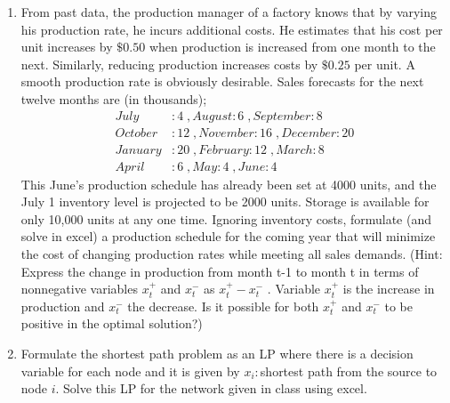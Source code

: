 \documentclass{article}[11 pt]    %
\begin{document}
\begin{enumerate}
\item From past data, the production manager of a factory knows that by varying his production rate, he incurs additional costs. He estimates that his cost per unit increases by $\$0.50$ when production is increased from one month to the next. Similarly, reducing production increases costs by $\$0.25$ per unit. A smooth production rate is obviously desirable.
Sales forecasts for the next twelve months are (in thousands);
\begin{align*}
July&:4 \;,August:6\; ,September:8\\
October&:12\;, November:16\;, December:20\\
January&:20 \;, February:12\;, March:8\\
April&:6 \;, May:4 \;, June:4
\end{align*}
This June's production schedule has already been set at 4000 units, and the July 1 inventory level is projected to be 2000 units. Storage is available for only 10,000 units at any one time. Ignoring inventory costs, formulate (and solve in excel) a production schedule for the coming year that will minimize the cost of changing production rates while meeting all sales demands. (Hint: Express the change in production from month t-1 to month t in terms of nonnegative variables $x_t^+$ and $x_t^-$ as $x_t^+ - x_t^-$ . Variable $x_t^+$ is the increase in production and $x_t^-$ the decrease. Is it possible for both $x_t^+$ and $x_t^-$ to be positive in the optimal solution?)
\item Formulate the shortest path problem as an LP where there is a decision variable for each node and it is given by $x_i:$shortest path from the source to node $i$.  Solve this LP for the network given in class using excel.

\end{enumerate}
\end{document}

